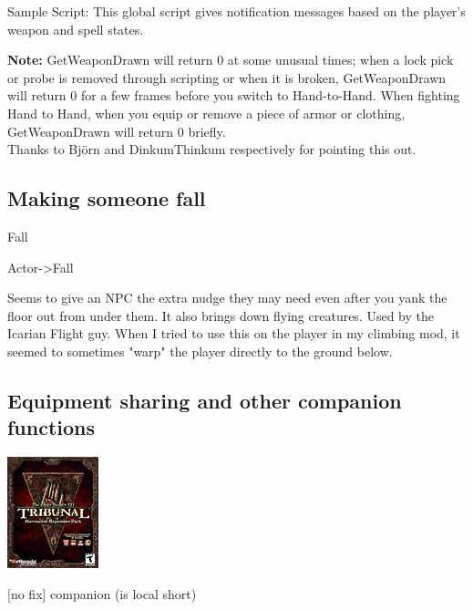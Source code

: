 Sample Script: This global script gives notification messages based on
the player's weapon and spell states.



\textbf{Note:} GetWeaponDrawn will return 0 at some unusual times; when
a lock pick or probe is removed through scripting or when it is broken,
GetWeaponDrawn will return 0 for a few frames before you switch to
Hand-to-Hand. When fighting Hand to Hand, when you equip or remove a
piece of armor or clothing, GetWeaponDrawn will return 0 briefly.\\
Thanks to Björn and DinkumThinkum respectively for pointing this out.

\hypertarget{section-7}{%
\subsection{}\label{section-7}}

\hypertarget{making-someone-fall}{%
\subsection{Making someone fall}\label{making-someone-fall}}

Fall

Actor-\textgreater Fall

Seems to give an NPC the extra nudge they may need even after you yank
the floor out from under them. It also brings down flying creatures.
Used by the Icarian Flight guy. When I tried to use this on the player
in my climbing mod, it seemed to sometimes "warp" the player directly to
the ground below.

\hypertarget{equipment-sharing-and-other-companion-functions}{%
\subsection{Equipment sharing and other companion
functions}\label{equipment-sharing-and-other-companion-functions}}

\includegraphics{media/image6.png}

{[}no fix{]} companion (is local short)

